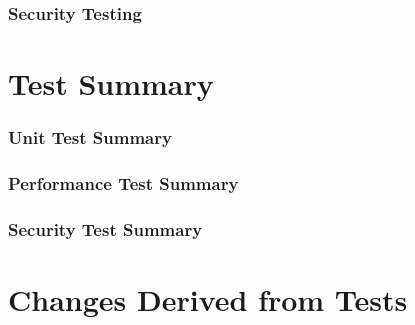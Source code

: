 \documentclass{article}
\begin{document}
\section{Security Testing}

\part*{Test Summary}
\section{Unit Test Summary}

\section{Performance Test Summary}

\section{Security Test Summary}

\part*{Changes Derived from Tests}
\end{document}
